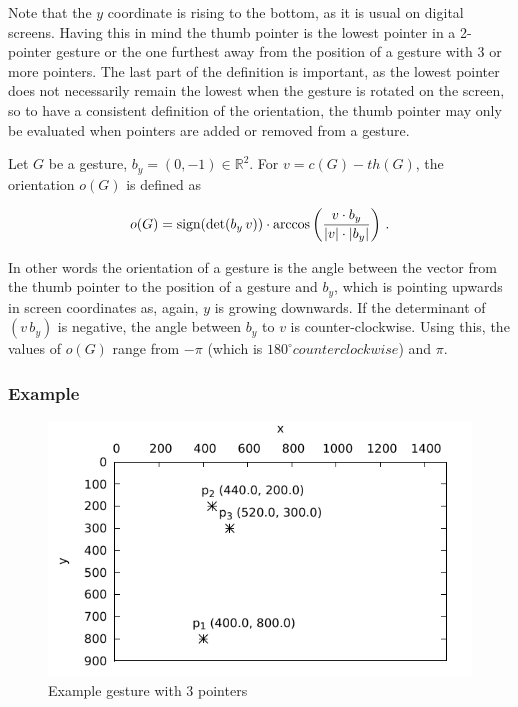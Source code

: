 Note that the $y$ coordinate is rising to the bottom, as it is usual on digital screens. Having this in mind the thumb pointer is the lowest pointer in a 2-pointer gesture or the one furthest away from the position of a gesture with 3 or more pointers. The last part of the definition is important, as the lowest pointer does not necessarily remain the lowest when the gesture is rotated on the screen, so to have a consistent definition of the orientation, the thumb pointer may only be evaluated when pointers are added or removed from a gesture.

\begin{defn}
	Let $G$ be a gesture, $b_y = (0, -1) \in \mathbb{R}^2$. For $v = c(G) - th(G)$, the orientation $o(G)$ is defined as
	
\begin{equation}
\label{eq:conc:orientation}
o(G) = \textnormal{sign}(\det(b_y\, v)) \cdot \arccos\left(\frac{v \cdot b_y}{|v| \cdot |b_y|}\right) \, .
\end{equation}	

\end{defn}


In other words the orientation of a gesture is the angle between the vector from the thumb pointer to the position of a gesture and $b_y$, which is pointing upwards in screen coordinates as, again, $y$ is growing downwards. If the determinant of $(v\,b_y)$ is negative, the angle between $b_y$ to $v$ is counter-clockwise\cite{Bronstein2012}. Using this, the values of $o(G)$ range from $-\pi$ (which is $180^\circ counterclockwise$) and $\pi$. 

\subsubsection{Example}

\begin{figure}
	\caption{\label{fig:touch:expl}Example gesture with 3 pointers}
	\includegraphics{assets/chpt_concepts/gestures/3pointers_blank.pdf}
\end{figure}

